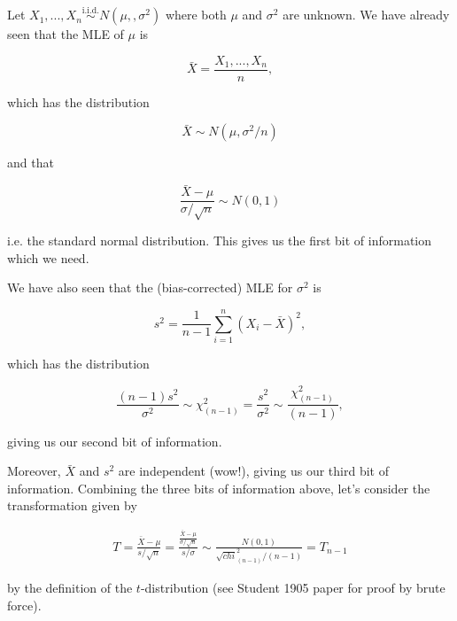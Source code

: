 Let \(X_1,...,X_n \overset{\text{i.i.d.}}{\sim} N(\mu,,\sigma^2)\) where both \(\mu\) and \(\sigma^2\) are unknown. 
We have already seen that the MLE of \(\mu\) is 

\begin{equation*}
    \bar{X} = \frac{X_1,...,X_n}{n},
\end{equation*}

which has the distribution 

\begin{equation*}
    \bar{X} \sim N(\mu,\sigma^2/n)
\end{equation*}

and that 

\begin{equation*}
    \frac{\bar{X} - \mu}{\sigma/\sqrt{n}} \sim N(0,1)
\end{equation*}

i.e. the standard normal distribution. 
This gives us the first bit of information which we need. 

\bigskip

We have also seen that the (bias-corrected) MLE for \(\sigma^2\) is 

\begin{equation*}
    s^2 = \frac{1}{n-1}\sum_{i=1}^{n}(X_i - \bar{X})^2,
\end{equation*}

which has the distribution 

\begin{equation*}
    \frac{(n-1)s^2}{\sigma^2} \sim \chi_{(n-1)}^2 = \frac{s^2}{\sigma^2} \sim \frac{\chi_{(n-1)}^2}{(n-1)},
\end{equation*}

giving us our second bit of information. 

\bigskip

Moreover, \(\bar{X}\) and \(s^2\) are independent (wow!), giving us our third bit of information. 
Combining the three bits of information above, let's consider the transformation given by 

\begin{align*}
    T = \frac{\bar{X} - \mu}{s/\sqrt{n}} = \frac{\frac{\bar{X} - \mu}{\sigma/\sqrt{n}}}{s/\sigma} \sim \frac{N(0,1)}{\sqrt{chi}_{(n-1)}^2/(n-1)} = T_{n-1}
\end{align*}

by the definition of the \(t\)-distribution (see Student 1905 paper for proof by brute force).

\bigskip

